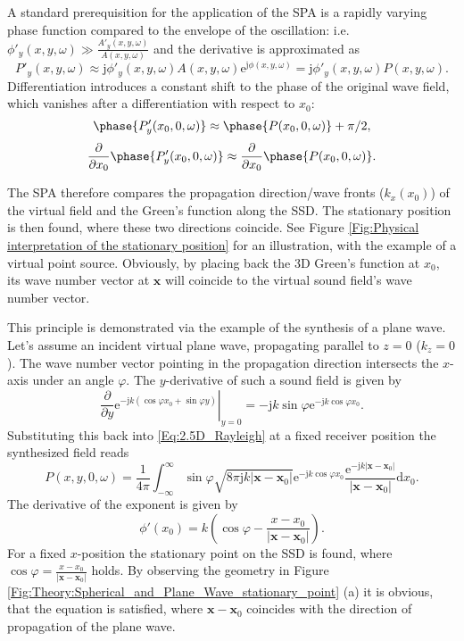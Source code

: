 \documentclass[12pt,a4paper]{article}
\newcommand{\td}{\mathrm{d}}
\newcommand{\te}{\mathrm{e}}
\newcommand{\ti}{\mathrm{j}}
\newcommand{\sinfi}{\sin\varphi}
\newcommand{\cosfi}{\cos\varphi}
\newcommand{\vx}{\mathbf{x}}
\newcommand{\vxo}{\mathbf{x}_0}
\begin{document}
A standard prerequisition for the application of the SPA is a rapidly varying phase function compared to the envelope of the oscillation: i.e. $\phi'_y(x,y,\omega) \gg \frac{A'_y(x,y,\omega)}{A(x,y,\omega)}$ and the derivative is approximated as
\begin{equation}
P'_y(x,y,\omega) \approx \ti \phi'_y(x,y,\omega) A(x,y,\omega)\te^{\ti \phi(x,y,\omega)} = \ti \phi'_y(x,y,\omega) P(x,y,\omega).
\label{Eq:y_derivative}
\end{equation}
Differentiation introduces a constant shift to the phase of the original wave field, which vanishes after a differentiation with respect to $x_0$:
\begin{equation}
\phase{ P'_y(x_0,0,\omega) } \approx \phase{ P(x_0,0,\omega) } + \pi/2,
\end{equation}
\begin{equation}
\frac{ \partial }{\partial x_0} \phase{ P'_y(x_0,0,\omega) } \approx  \frac{ \partial }{\partial x_0}\phase{ P(x_0,0,\omega) }.
\end{equation}

The SPA therefore compares the propagation direction/wave fronts ($k_x(x_0)$) of the virtual field and the Green's function along the SSD. The stationary position is then found, where these two directions coincide. See Figure \ref{Fig:Physical interpretation of the stationary position} for an illustration, with the example of a virtual point source. Obviously, by placing back the 3D Green's function at $x_0$, its wave number vector at $\vx$ will coincide to the virtual sound field's wave number vector. 

\vspace{3mm}
This principle is demonstrated via the example of the synthesis of a plane wave. Let's assume an incident virtual plane wave, propagating parallel to $z=0$ ($k_z = 0$). The wave number vector pointing in the propagation direction intersects the $x$-axis under an angle $\varphi$. The $y$-derivative of such a sound field is given by
\begin{equation}
\left. \frac{\partial}{\partial y} \te^{-\ti k ( \cosfi x_0 + \sinfi y )} \right|_{ y = 0 } = -\ti k \sinfi \te^{-\ti k \cosfi x_0}.
\end{equation}
Substituting this back into \eqref{Eq:2.5D_Rayleigh} at a fixed receiver position the synthesized field reads
\begin{equation}
P(x,y,0,\omega) = \frac{1}{4\pi}
 \int_{-\infty}^{\infty} \sinfi \sqrt{8\pi \ti k |\vx-\vxo|} \te^{-\ti k \cosfi x_0} \frac{\te^{-\ti k |\vx - \vxo|}}{|\vx - \vxo|} \td x_0.
\end{equation}
The derivative of the exponent is given by
\begin{equation}
\phi'(x_0) = k \left( \cosfi - \frac{x-x_0}{|\vx - \vxo|} \right).
\end{equation}
For a fixed $x$-position the stationary point on the SSD is found, where $\cosfi = \frac{x-x_0}{|\vx-\vxo|}$ holds. By observing the geometry in Figure \ref{Fig:Theory:Spherical_and_Plane_Wave_stationary_point} (a) it is obvious, that the equation is satisfied, where $\vx-\vxo$ coincides with the direction of propagation of the plane wave.
\end{document}
